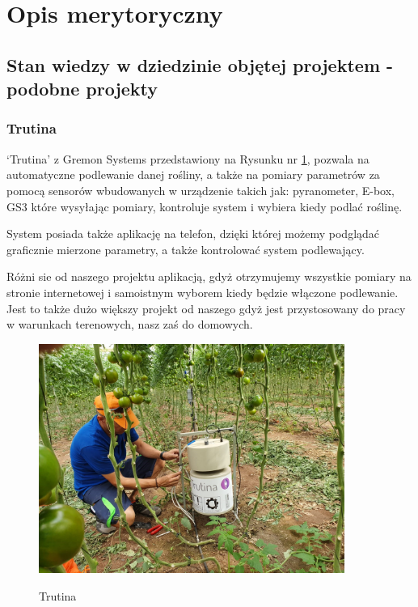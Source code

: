 \documentclass[12pt]{article}
\begin{document}
\newpage
\section{Opis merytoryczny}

\subsection{Stan wiedzy w dziedzinie objętej projektem - podobne projekty}


\subsubsection{Trutina}
‘Trutina’ z Gremon Systems przedstawiony na Rysunku nr \ref{fig:Trutina},
 pozwala na automatyczne podlewanie danej rośliny, a także na pomiary parametrów za pomocą sensorów wbudowanych w urządzenie takich jak: pyranometer, E-box, GS3 które wysyłając pomiary, kontroluje system i wybiera kiedy podlać roślinę. 

System posiada także aplikację na telefon, dzięki której możemy podglądać graficznie mierzone parametry, a także kontrolować system podlewający. 


Różni sie od naszego projektu aplikacją, gdyż otrzymujemy wszystkie pomiary na stronie internetowej i samoistnym wyborem kiedy będzie włączone podlewanie. Jest to także dużo większy projekt od naszego gdyż jest przystosowany do pracy w warunkach terenowych, nasz zaś do domowych.



\begin{figure}[!h]
	\begin{center}
		{\includegraphics[width=10cm]{auto_water1.jpg}}
	\end{center}
	\caption{Trutina ~\cite{Trutina}}
	\label{fig:Trutina}
\end{figure}
\end{document}
